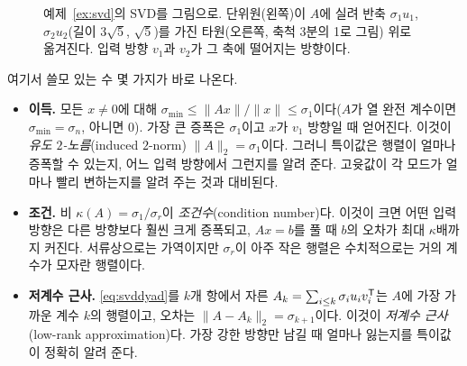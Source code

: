 \documentclass[11pt]{article}
\begin{document}
\begin{figure}[htb]
\centering
{}
\caption{예제~\ref{ex:svd}의 SVD를 그림으로. 단위원(왼쪽)이 $A$에 실려 반축
$\sigma_1u_1$, $\sigma_2u_2$(길이 $3\sqrt5$, $\sqrt5$)를 가진 타원(오른쪽, 축척
3분의 1로 그림) 위로 옮겨진다. 입력 방향 $v_1$과 $v_2$가 그 축에 떨어지는
방향이다.}
\label{fig:svd}
\end{figure}

여기서 쓸모 있는 수 몇 가지가 바로 나온다.
\begin{itemize}[leftmargin=*,itemsep=2pt]
\item \textbf{이득.} 모든 $x\neq0$에 대해
$\sigma_{\min}\le\|Ax\|/\|x\|\le\sigma_1$이다($A$가 열 완전 계수이면
$\sigma_{\min}=\sigma_n$, 아니면 $0$). 가장 큰 증폭은 $\sigma_1$이고 $x$가 $v_1$
방향일 때 얻어진다. 이것이 \emph{유도 $2$-노름}(induced $2$-norm)
$\|A\|_2=\sigma_1$이다. 그러니 특이값은 행렬이 얼마나 증폭할 수 있는지, 어느 입력
방향에서 그런지를 알려 준다. 고윳값이 각 모드가 얼마나 빨리 변하는지를 알려 주는
것과 대비된다.
\item \textbf{조건.} 비 $\kappa(A)=\sigma_1/\sigma_r$이 \emph{조건수}(condition
number)다. 이것이 크면 어떤 입력 방향은 다른 방향보다 훨씬 크게 증폭되고, $Ax=b$를
풀 때 $b$의 오차가 최대 $\kappa$배까지 커진다. 서류상으로는 가역이지만 $\sigma_r$이
아주 작은 행렬은 수치적으로는 거의 계수가 모자란 행렬이다.
\item \textbf{저계수 근사.} \eqref{eq:svddyad}를 $k$개 항에서 자른
$A_k=\sum_{i\le k}\sigma_iu_iv_i^{\mathsf{T}}$는 $A$에 가장 가까운 계수 $k$의 행렬이고, 오차는
$\|A-A_k\|_2=\sigma_{k+1}$이다. 이것이 \emph{저계수 근사}(low-rank
approximation)다. 가장 강한 방향만 남길 때 얼마나 잃는지를 특이값이 정확히 알려 준다.
\end{itemize}
\end{document}
